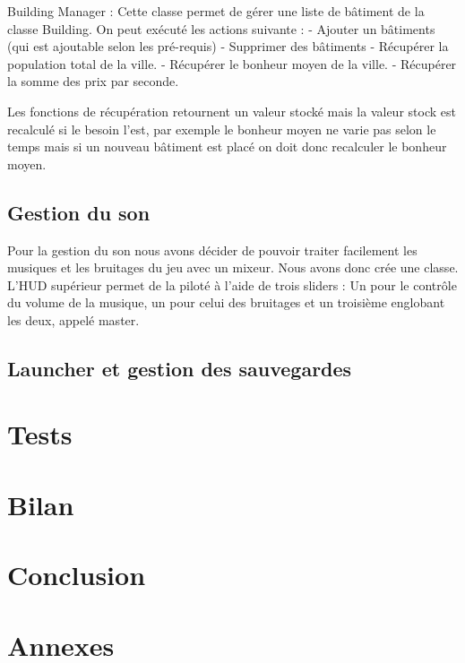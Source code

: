 \documentclass[a4paper,10pt,openany,oneside]{book}
\begin{document}
Building Manager :
Cette classe permet de gérer une liste de bâtiment de la classe Building. On peut exécuté les actions suivante :
 - Ajouter un bâtiments (qui est ajoutable selon les pré-requis)
 - Supprimer des bâtiments 
 - Récupérer la population total de la ville.
 - Récupérer le bonheur moyen de la ville.
 - Récupérer la somme des prix par seconde.

Les fonctions de récupération retournent un valeur stocké mais la valeur stock est recalculé si le besoin l'est, par exemple le bonheur moyen ne varie pas selon le temps mais si un nouveau bâtiment est placé on doit donc recalculer le bonheur moyen.

\section{Gestion du son}
Pour la gestion du son nous avons décider de pouvoir traiter facilement les musiques et les bruitages du jeu avec un mixeur. Nous avons donc crée une classe. L'HUD supérieur permet de la piloté à l'aide de trois sliders : Un pour le contrôle du volume de la musique, un pour celui des bruitages et un troisième englobant les deux, appelé master.

\section{Launcher et gestion des sauvegardes}


\chapter{Tests}
\thispagestyle{headings}


\chapter{Bilan}
\thispagestyle{headings}


\chapter{Conclusion}
\thispagestyle{headings}


\chapter{Annexes}
\thispagestyle{headings}
\end{document}
